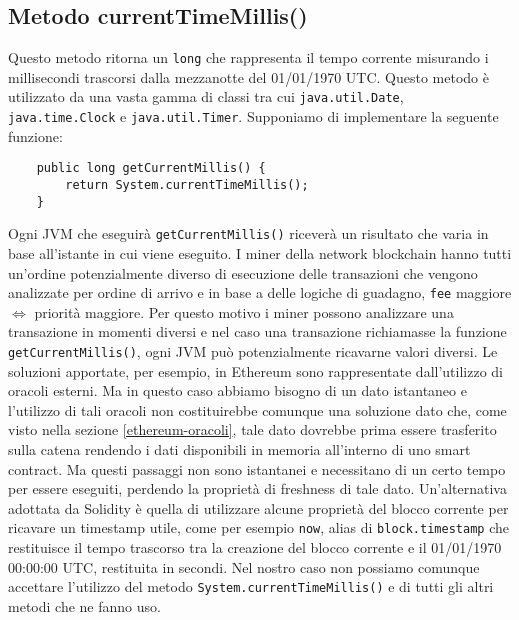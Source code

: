 		\subsection{Metodo currentTimeMillis()}
			Questo metodo ritorna un \lstinline|long| che rappresenta il tempo corrente misurando i millisecondi trascorsi dalla mezzanotte del 01/01/1970 UTC. 
			Questo metodo è utilizzato da una vasta gamma di classi tra cui \lstinline|java.util.Date|, \lstinline|java.time.Clock| e \lstinline|java.util.Timer|. Supponiamo di implementare la seguente funzione: 
		\begin{lstlisting}
	public long getCurrentMillis() {
		return System.currentTimeMillis();
	}
		\end{lstlisting}
			Ogni JVM che eseguirà \lstinline|getCurrentMillis()| riceverà un risultato che varia in base all'istante in cui viene eseguito. I miner della network blockchain hanno tutti un'ordine potenzialmente diverso di esecuzione delle transazioni che vengono analizzate per ordine di arrivo e in base a delle logiche di guadagno, \lstinline|fee| maggiore $\Leftrightarrow$ priorità maggiore. Per questo motivo i miner possono analizzare una transazione in momenti diversi e nel caso una transazione richiamasse la funzione \lstinline|getCurrentMillis()|, ogni JVM può potenzialmente ricavarne valori diversi. Le soluzioni apportate, per esempio, in Ethereum sono rappresentate dall'utilizzo di oracoli esterni. Ma in questo caso abbiamo bisogno di un dato istantaneo e l'utilizzo di tali oracoli non costituirebbe comunque una soluzione dato che, come visto nella sezione \ref{ethereum-oracoli}, tale dato dovrebbe prima essere trasferito sulla catena rendendo i dati disponibili in memoria all'interno di uno smart contract. Ma questi passaggi non sono istantanei e necessitano di un certo tempo per essere eseguiti, perdendo la proprietà di freshness di tale dato. Un'alternativa adottata da Solidity è quella di utilizzare alcune proprietà del blocco corrente per ricavare un timestamp utile, come per esempio \lstinline|now|, alias di \lstinline|block.timestamp| che restituisce il tempo trascorso tra la creazione del blocco corrente e il 01/01/1970 00:00:00 UTC, restituita in secondi.
			Nel nostro caso non possiamo comunque accettare l'utilizzo del metodo \lstinline|System.currentTimeMillis()| e di tutti gli altri metodi che ne fanno uso.
		
